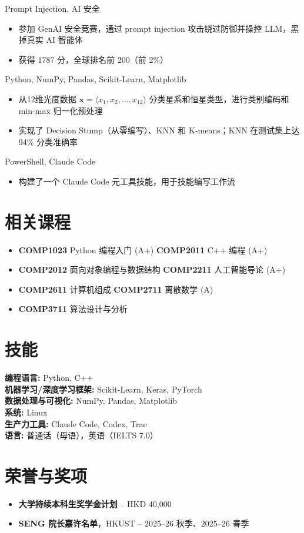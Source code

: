 \documentclass{common/resume}
\begin{document}
  {Prompt Injection, AI 安全}

\begin{itemize}
  \item 参加 GenAI 安全竞赛，通过 prompt injection 攻击绕过防御并操控 LLM，黑掉真实 AI 智能体
  \item 获得 1787 分，全球排名前 200（前 2\%）
\end{itemize}

  {Python, NumPy, Pandas, Scikit-Learn, Matplotlib}

\begin{itemize}
  \item 从12维光度数据 $\mathbf{x} = \langle x_1, x_2, \ldots, x_{12} \rangle$ 分类星系和恒星类型，进行类别编码和 min-max 归一化预处理
  \item 实现了 Decision Stump（从零编写）、KNN 和 K-means；KNN 在测试集上达 94\% 分类准确率
\end{itemize}

  {PowerShell, Claude Code}

\begin{itemize}
  \item 构建了一个 Claude Code 元工具技能，用于技能编写工作流
\end{itemize}

\section{相关课程}

\begin{itemize}
  \item \textbf{COMP1023} Python 编程入门 (A+) \hfill \textbf{COMP2011} C++ 编程 (A+)
  \item \textbf{COMP2012} 面向对象编程与数据结构 \hfill \textbf{COMP2211} 人工智能导论 (A+)
  \item \textbf{COMP2611} 计算机组成 \hfill \textbf{COMP2711} 离散数学 (A)
  \item \textbf{COMP3711} 算法设计与分析
\end{itemize}

\section{技能}

\textbf{编程语言:} Python, C++ \\
\textbf{机器学习/深度学习框架:} Scikit-Learn, Keras, PyTorch \\
\textbf{数据处理与可视化:} NumPy, Pandas, Matplotlib \\
\textbf{系统:} Linux \\
\textbf{生产力工具:} Claude Code, Codex, Trae \\
\textbf{语言:} 普通话（母语），英语（IELTS 7.0）

\section{荣誉与奖项}

\begin{itemize}
  \item \textbf{大学持续本科生奖学金计划} -- HKD 40,000
  \item \textbf{SENG 院长嘉许名单}，HKUST -- 2025--26 秋季、2025--26 春季
\end{itemize}
\end{document}
